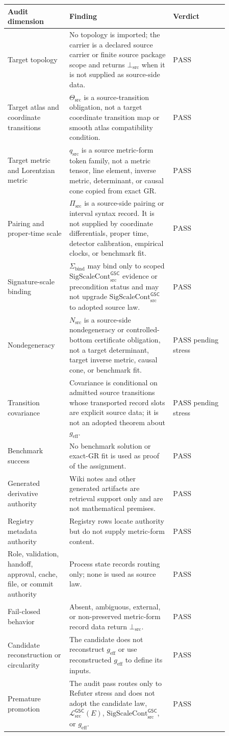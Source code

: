 \documentclass[11pt]{article}
\newcommand{\MetricData}{\mathcal{L}_{\mathrm{src}}^{\mathsf{GSC}}}
\newcommand{\geff}{g_{\mathrm{eff}}}
\newcommand{\SigScaleCont}{\mathrm{SigScaleCont}_{\mathrm{src}}^{\mathsf{GSC}}}
\newcommand{\FormTok}{q_{\mathrm{src}}}
\newcommand{\PairTok}{\Pi_{\mathrm{src}}}
\newcommand{\TransportTok}{\Theta_{\mathrm{src}}}
\newcommand{\NondegTok}{N_{\mathrm{src}}}
\newcommand{\BottomSrc}{\bot_{\mathrm{src}}}
\newcommand{\Pass}{\mathrm{PASS}}
\begin{document}
\begin{longtable}{p{0.23\linewidth}p{0.41\linewidth}p{0.22\linewidth}}
\toprule
Audit dimension & Finding & Verdict \\
\midrule
Target topology & No topology is imported; the carrier is a declared source
carrier or finite source package scope and returns \(\BottomSrc\) when it is
not supplied as source-side data. & \(\Pass\) \\
Target atlas and coordinate transitions & \(\TransportTok\) is a
source-transition obligation, not a target coordinate transition map or smooth
atlas compatibility condition. & \(\Pass\) \\
Target metric and Lorentzian metric & \(\FormTok\) is a source metric-form
token family, not a metric tensor, line element, inverse metric, determinant,
or causal cone copied from exact GR. & \(\Pass\) \\
Pairing and proper-time scale & \(\PairTok\) is a source-side pairing or
interval syntax record. It is not supplied by coordinate differentials, proper
time, detector calibration, empirical clocks, or benchmark fit. & \(\Pass\) \\
Signature-scale binding & \(\Sigma_{\mathrm{bind}}\) may bind only to scoped
\(\SigScaleCont\) evidence or precondition status and may not upgrade
\(\SigScaleCont\) to adopted source law. & \(\Pass\) \\
Nondegeneracy & \(\NondegTok\) is a source-side nondegeneracy or
controlled-bottom certificate obligation, not a target determinant, target
inverse metric, causal cone, or benchmark fit. & \(\Pass\) pending stress \\
Transition covariance & Covariance is conditional on admitted source
transitions whose transported record slots are explicit source data; it is not
an adopted theorem about \(\geff\). & \(\Pass\) pending stress \\
Benchmark success & No benchmark solution or exact-GR fit is used as proof of
the assignment. & \(\Pass\) \\
Generated derivative authority & Wiki notes and other generated artifacts are
retrieval support only and are not mathematical premises. & \(\Pass\) \\
Registry metadata authority & Registry rows locate authority but do not supply
metric-form content. & \(\Pass\) \\
Role, validation, handoff, approval, cache, file, or commit authority & Process
state records routing only; none is used as source law. & \(\Pass\) \\
Fail-closed behavior & Absent, ambiguous, external, or non-preserved
metric-form record data return \(\BottomSrc\). & \(\Pass\) \\
Candidate reconstruction or circularity & The candidate does not reconstruct
\(\geff\) or use reconstructed \(\geff\) to define its inputs. & \(\Pass\) \\
Premature promotion & The audit pass routes only to Refuter stress and does
not adopt the candidate law, \(\MetricData(E)\), \(\SigScaleCont\), or
\(\geff\). & \(\Pass\) \\
\bottomrule
\end{longtable}
\end{document}
